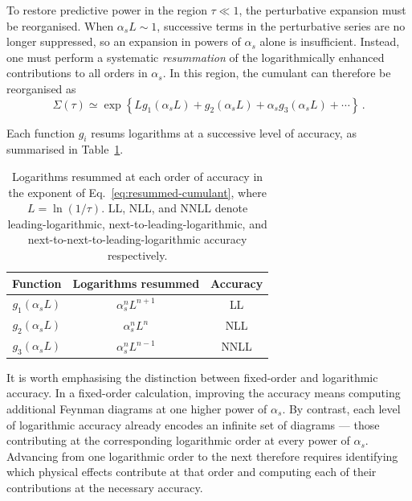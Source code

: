 To restore predictive power in the region $\tau \ll 1$, the perturbative 
expansion must be reorganised. When $\alpha_s L \sim 1$, successive 
terms in the perturbative series are no longer suppressed, so an 
expansion in powers of $\alpha_s$ alone is insufficient. Instead, one 
must perform a systematic \emph{resummation} of the logarithmically enhanced 
contributions to all orders in $\alpha_s$. In this region, the cumulant can 
therefore be reorganised as 
\begin{equation}
\label{eq:resummed-cumulant}
	\Sigma(\tau) \simeq 
	\exp \left\{ 
	L g_1(\alpha_s L) 
	+ g_2(\alpha_s L) 
	+ \alpha_s g_3(\alpha_s L) 
	+ \cdots 
	\right\}\,.
\end{equation}

Each function $g_i$ resums logarithms at a successive level of accuracy,
as summarised in Table~\ref{tab:log-accuracy}.
\begin{table}[h]
\begin{center}
\begin{tabular}{c|c|c}
\hline\hline
Function & Logarithms resummed & Accuracy \\
\hline\hline
$g_1(\alpha_s L)$ & $\alpha_s^n L^{n+1}$ & LL \\
\hline
$g_2(\alpha_s L)$ & $\alpha_s^n L^{n}$   & NLL \\
\hline
$g_3(\alpha_s L)$ & $\alpha_s^n L^{n-1}$ & NNLL \\
\hline\hline
\end{tabular}
\end{center}
\caption{Logarithms resummed at each order of accuracy in the exponent 
of Eq.~\eqref{eq:resummed-cumulant}, where $L = \ln(1/\tau)$. LL, NLL, 
and NNLL denote leading-logarithmic, next-to-leading-logarithmic, and 
next-to-next-to-leading-logarithmic accuracy respectively.}
\label{tab:log-accuracy}
\end{table}

It is worth emphasising the distinction between fixed-order and logarithmic
accuracy. In a fixed-order calculation, improving the accuracy means
computing additional Feynman diagrams at one higher power of $\alpha_s$.
By contrast, each level of logarithmic accuracy already encodes an infinite
set of diagrams --- those contributing at the corresponding logarithmic
order at every power of $\alpha_s$. Advancing from one logarithmic order to the next therefore 
requires identifying which physical effects contribute at that order and 
computing each of their contributions at the necessary accuracy.

